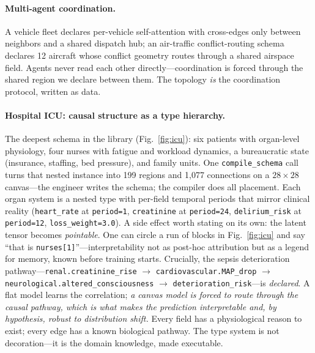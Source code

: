 \documentclass[10pt,twocolumn]{article}
\newcommand{\code}[1]{\texttt{\small #1}}
\begin{document}
\paragraph{Multi-agent coordination.}
A vehicle fleet declares per-vehicle self-attention with cross-edges only between neighbors and a shared dispatch hub; an air-traffic conflict-routing schema declares 12 aircraft whose conflict geometry routes through a shared airspace field. Agents never read each other directly---coordination is forced through the shared region we declare between them. The topology \emph{is} the coordination protocol, written as data.

\paragraph{Hospital ICU: causal structure as a type hierarchy.}
The deepest schema in the library (Fig.~\ref{fig:icu}): six patients with organ-level physiology, four nurses with fatigue and workload dynamics, a bureaucratic state (insurance, staffing, bed pressure), and family units. One \code{compile\_schema} call turns that nested instance into 199 regions and 1{,}077 connections on a $28\times28$ canvas---the engineer writes the schema; the compiler does all placement. Each organ system is a nested type with per-field temporal periods that mirror clinical reality (\code{heart\_rate} at \code{period=1}, \code{creatinine} at \code{period=24}, \code{delirium\_risk} at \code{period=12}, \code{loss\_weight=3.0}). A side effect worth stating on its own: the latent tensor becomes \emph{pointable}. One can circle a run of blocks in Fig.~\ref{fig:icu} and say ``that is \code{nurses[1]}''---interpretability not as post-hoc attribution but as a legend for memory, known before training starts. Crucially, the sepsis deterioration pathway---\code{renal.creatinine\_rise} $\rightarrow$ \code{cardiovascular.MAP\_drop} $\rightarrow$ \code{neurological.altered\_consciousness} $\rightarrow$ \code{deterioration\_risk}---is \emph{declared}. A flat model learns the correlation; \emph{a canvas model is forced to route through the causal pathway, which is what makes the prediction interpretable and, by hypothesis, robust to distribution shift.} Every field has a physiological reason to exist; every edge has a known biological pathway. The type system is not decoration---it is the domain knowledge, made executable.
\end{document}
